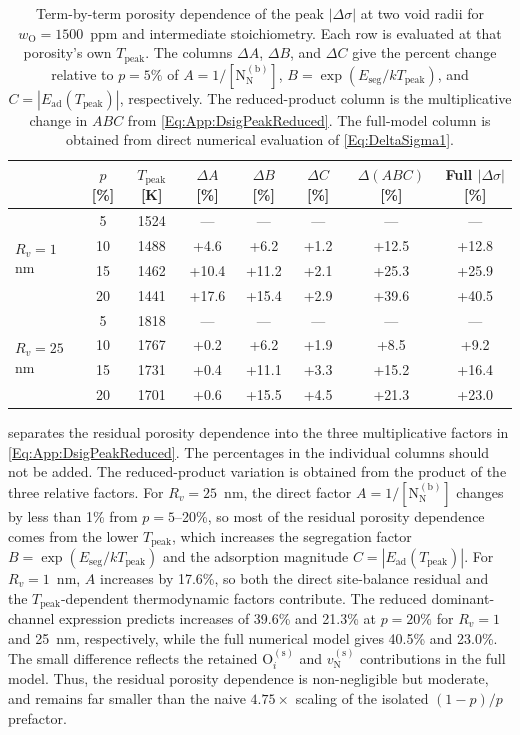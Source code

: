 \documentclass[preprint,12pt,sort&compress]{elsarticle}
\newcommand{\?}{\stackrel{?}{=}}
\begin{document}
\begin{table}[h!]
\centering
\scriptsize
\caption{Term-by-term porosity dependence of the peak $|\Delta\sigma|$ at two void radii for $w_\text{O}=1500$~ppm and intermediate stoichiometry. Each row is evaluated at that porosity's own $T_\text{peak}$. The columns $\Delta A$, $\Delta B$, and $\Delta C$ give the percent change relative to $p=5\%$ of $A=1/[\text{N}_\text{N}^{(\text{b})}]$, $B=\exp(E_\text{seg}/kT_\text{peak})$, and $C=|E_\text{ad}(T_\text{peak})|$, respectively. The reduced-product column is the multiplicative change in $ABC$ from \cref{Eq:App:DsigPeakReduced}. The full-model column is obtained from direct numerical evaluation of \cref{Eq:DeltaSigma1}.}
\label{Tab:App:por}
\begin{tabular}{lccccccc}
\hline
& $p$ [\%]
& $T_\text{peak}$ [K]
& $\Delta A$ [\%]
& $\Delta B$ [\%]
& $\Delta C$ [\%]
& $\Delta(ABC)$ [\%]
& Full $|\Delta\sigma|$ [\%] \\
\hline
\multirow{4}{*}{$R_v = 1$ nm}
& 5  & 1524 & ---   & ---   & ---  & ---   & --- \\
& 10 & 1488 & +4.6  & +6.2  & +1.2 & +12.5 & +12.8 \\
& 15 & 1462 & +10.4 & +11.2 & +2.1 & +25.3 & +25.9 \\
& 20 & 1441 & +17.6 & +15.4 & +2.9 & +39.6 & +40.5 \\
\hline
\multirow{4}{*}{$R_v = 25$ nm}
& 5  & 1818 & ---  & ---   & ---  & ---   & --- \\
& 10 & 1767 & +0.2 & +6.2  & +1.9 & +8.5  & +9.2 \\
& 15 & 1731 & +0.4 & +11.1 & +3.3 & +15.2 & +16.4 \\
& 20 & 1701 & +0.6 & +15.5 & +4.5 & +21.3 & +23.0 \\
\hline
\end{tabular}
\end{table}

 separates the residual porosity dependence into the three multiplicative factors in \cref{Eq:App:DsigPeakReduced}. The percentages in the individual columns should not be added. The reduced-product variation is obtained from the product of the three relative factors. For $R_v=25$~nm, the direct factor $A=1/[\text{N}_\text{N}^{(\text{b})}]$ changes by less than 1\% from $p=5$--20\%, so most of the residual porosity dependence comes from the lower $T_\text{peak}$, which increases the segregation factor $B=\exp(E_\text{seg}/kT_\text{peak})$ and the adsorption magnitude $C=|E_\text{ad}(T_\text{peak})|$. For $R_v=1$~nm, $A$ increases by 17.6\%, so both the direct site-balance residual and the $T_\text{peak}$-dependent thermodynamic factors contribute. The reduced dominant-channel expression predicts increases of 39.6\% and 21.3\% at $p=20\%$ for $R_v=1$ and 25~nm, respectively, while the full numerical model gives 40.5\% and 23.0\%. The small difference reflects the retained $\text{O}_i^{(\text{s})}$ and $v_\text{N}^{(\text{s})}$ contributions in the full model. Thus, the residual porosity dependence is non-negligible but moderate, and remains far smaller than the naive $4.75\times$ scaling of the isolated $(1-p)/p$ prefactor.
\end{document}

